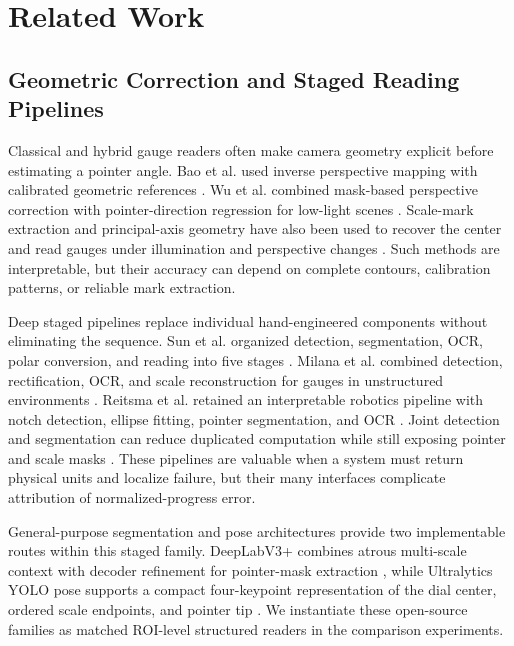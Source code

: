 \documentclass[electronics,article,submit,oneauthor]{Definitions/mdpi}
\begin{document}
\section{Related Work}
\label{sec:related}

\subsection{Geometric Correction and Staged Reading Pipelines}

Classical and hybrid gauge readers often make camera geometry explicit before estimating a pointer angle. Bao et al. used inverse perspective mapping with calibrated geometric references \cite{bao2019ipm}. Wu et al. combined mask-based perspective correction with pointer-direction regression for low-light scenes \cite{wu2021lowlight}. Scale-mark extraction and principal-axis geometry have also been used to recover the center and read gauges under illumination and perspective changes \cite{wang2022scalemark}. Such methods are interpretable, but their accuracy can depend on complete contours, calibration patterns, or reliable mark extraction.

Deep staged pipelines replace individual hand-engineered components without eliminating the sequence. Sun et al. organized detection, segmentation, OCR, polar conversion, and reading into five stages \cite{sun2023pointer}. Milana et al. combined detection, rectification, OCR, and scale reconstruction for gauges in unstructured environments \cite{milana2022gauges}. Reitsma et al. retained an interpretable robotics pipeline with notch detection, ellipse fitting, pointer segmentation, and OCR \cite{reitsma2024underpressure}. Joint detection and segmentation can reduce duplicated computation while still exposing pointer and scale masks \cite{li2024joint}. These pipelines are valuable when a system must return physical units and localize failure, but their many interfaces complicate attribution of normalized-progress error.

General-purpose segmentation and pose architectures provide two implementable routes within this staged family. DeepLabV3+ combines atrous multi-scale context with decoder refinement for pointer-mask extraction \cite{chen2018deeplabv3plus}, while Ultralytics YOLO pose supports a compact four-keypoint representation of the dial center, ordered scale endpoints, and pointer tip \cite{jocher2023ultralytics}. We instantiate these open-source families as matched ROI-level structured readers in the comparison experiments.
\end{document}
